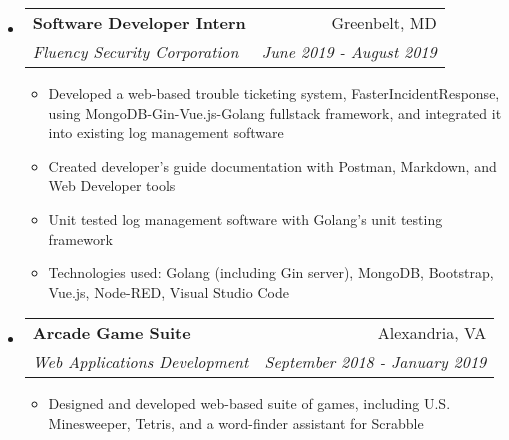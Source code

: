 \documentclass[letterpaper,10pt]{article}
\makeatletter
\newcommand{\resitem}[1]{\item #1 \vspace{-2pt}}
\newcommand{\ressubheading}[4]{
\begin{tabular*}{7.0in}{l@{\extracolsep{\fill}}r}
		\textbf{#1} & #2 \\
		\textit{#3} & \textit{#4} \\
\end{tabular*}\vspace{-6pt}}
\makeatother
\begin{document}
\begin{itemize}
\item
    \ressubheading{Software Developer Intern}{Greenbelt, MD}{Fluency Security Corporation}{June 2019 - August 2019}
	\begin{itemize}
	    \resitem{Developed a web-based trouble ticketing system, FasterIncidentResponse, using MongoDB-Gin-Vue.js-Golang fullstack framework, and integrated it into existing log management software}
		\resitem{Created developer's guide documentation with Postman, Markdown, and Web Developer tools}
		\resitem{Unit tested log management software with Golang's unit testing framework}
		\resitem{Technologies used: Golang (including Gin server), MongoDB, Bootstrap, Vue.js, Node-RED, Visual Studio Code}
	\end{itemize}
\item
    \ressubheading{Arcade Game Suite}{Alexandria, VA}{Web Applications Development}{September 2018 - January 2019}
	\begin{itemize}
		\resitem{Designed and developed web-based suite of games, including U.S. Minesweeper, Tetris, and a word-finder assistant for Scrabble}

\end{itemize}
\end{itemize}
\end{document}
